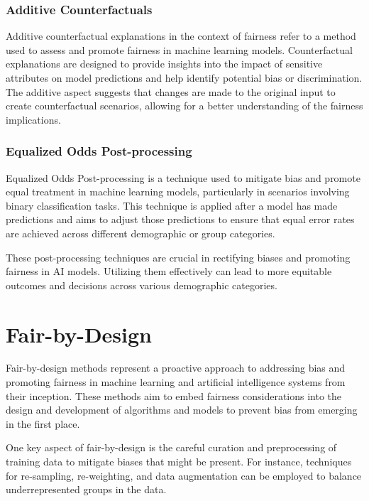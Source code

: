 \documentclass[12pt,a4paper,openright,twoside]{book}
\begin{document}
\subsubsection{Additive Counterfactuals}

Additive counterfactual explanations in the context of fairness refer to a method used to assess and promote fairness in machine learning models. Counterfactual explanations are designed to provide insights into the impact of sensitive attributes on model predictions and help identify potential bias or discrimination. The additive aspect suggests that changes are made to the original input to create counterfactual scenarios, allowing for a better understanding of the fairness implications. \cite{NIPS2017_a486cd07}

\subsubsection{Equalized Odds Post-processing}

Equalized Odds Post-processing is a technique used to mitigate bias and promote equal treatment in machine learning models, particularly in scenarios involving binary classification tasks. This technique is applied after a model has made predictions and aims to adjust those predictions to ensure that equal error rates are achieved across different demographic or group categories. \cite{10.1145/3442188.3445902}

These post-processing techniques are crucial in rectifying biases and promoting fairness in AI models. Utilizing them effectively can lead to more equitable outcomes and decisions across various demographic categories.

\newpage
\section{Fair-by-Design}

Fair-by-design methods represent a proactive approach to addressing bias and promoting fairness in machine learning and artificial intelligence systems from their inception. These methods aim to embed fairness considerations into the design and development of algorithms and models to prevent bias from emerging in the first place. 

One key aspect of fair-by-design is the careful curation and preprocessing of training data to mitigate biases that might be present. For instance, techniques for re-sampling, re-weighting, and data augmentation can be employed to balance underrepresented groups in the data. 
\end{document}
